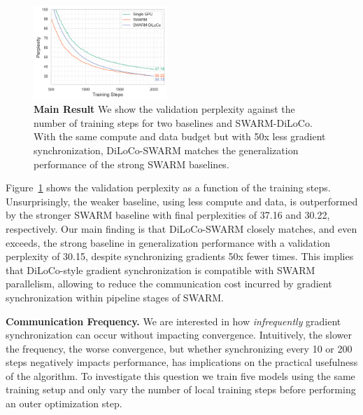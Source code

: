 \documentclass{article}
\begin{document}
\begin{figure}[ht]
  \centering
  \includegraphics[width=0.45\textwidth]{figures/experiment1.png}
  \caption{\textbf{Main Result} We show the validation perplexity against the number of training steps for two baselines and SWARM-DiLoCo. With the same compute and
  data budget but with 50x less gradient synchronization, DiLoCo-SWARM matches the 
  generalization performance of the strong SWARM baselines.}
  \label{fig:experiment1}
\end{figure}

Figure~\ref{fig:experiment1} shows the validation perplexity as a function of
the training steps. Unsurprisingly, the weaker baseline, using less compute and
data, is outperformed by the stronger SWARM baseline with final perplexities of 
37.16 and 30.22, respectively. Our main finding is that DiLoCo-SWARM closely
matches, and even exceeds, the strong baseline in generalization performance
with a validation perplexity of 30.15, despite synchronizing gradients 50x fewer
times. This implies that DiLoCo-style gradient synchronization is compatible
with SWARM parallelism, allowing to reduce the communication cost incurred by 
gradient synchronization within pipeline stages of SWARM.

\textbf{Communication Frequency.} We are interested in how \textit{infrequently}
gradient synchronization can occur without impacting convergence. Intuitively,
the slower the frequency, the worse convergence, but whether synchronizing every
10 or 200 steps negatively impacts performance, has implications on the
practical usefulness of the algorithm. To investigate this question we train
five models using the same training setup and only vary the number of local
training steps before performing an outer optimization step.
\end{document}
